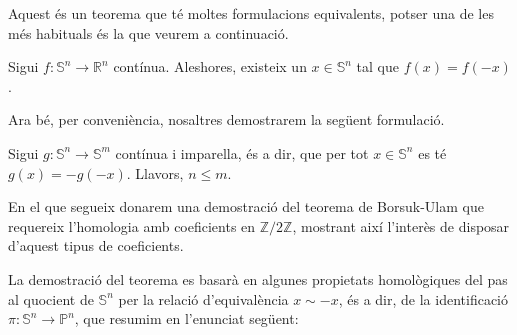 \documentclass[../main.tex]{subfiles}
\begin{document}
Aquest és un teorema que té moltes formulacions equivalents, potser una de les més habituals és la que veurem a continuació. 

\begin{ter}
\label{ter:borsukulam} Sigui $f:\mathbb{S}^n\rightarrow\mathbb{R}^n$ contínua. Aleshores, existeix un $x\in\mathbb{S}^n$ tal que $f(x) = f(-x)$.
\end{ter}

Ara bé, per conveniència, nosaltres demostrarem la següent formulació.

\begin{ter}
 Sigui $g:\mathbb{S}^n\rightarrow \mathbb{S}^m$ contínua i imparella, és a dir, que per tot $x\in\mathbb{S}^n$ es té $g(x) = -g(-x)$. Llavors, $n\leq m$.
\end{ter}

En el que segueix donarem una demostració del teorema de Borsuk-Ulam que requereix l'homologia amb coeficients en $\mathbb{Z}/2\mathbb{Z}$, mostrant així l'interès de disposar d'aquest tipus de coeficients.

La demostració del teorema es basarà en algunes propietats homològiques del pas al quocient de $\mathbb{S}^n$ per la relació d'equivalència $x\sim-x$, és a dir, de la identificació $\pi:\mathbb{S}^n\rightarrow\mathbb{P}^n$, que resumim en l'enunciat següent:
\end{document}
